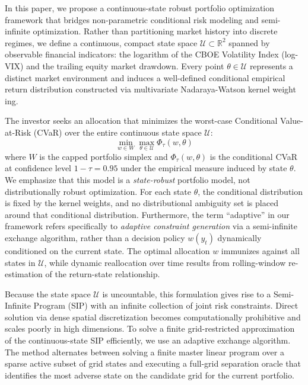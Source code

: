 \documentclass[smallextended]{svjour3}
\begin{document}
In this paper, we propose a continuous-state robust portfolio optimization framework that bridges non-parametric conditional risk modeling and semi-infinite optimization. Rather than partitioning market history into discrete regimes, we define a continuous, compact state space $\mathcal{U} \subset \mathbb{R}^2$ spanned by observable financial indicators: the logarithm of the CBOE Volatility Index (log-VIX) \cite{cboe2026vix} and the trailing equity market drawdown. Every point $\theta \in \mathcal{U}$ represents a distinct market environment and induces a well-defined conditional empirical return distribution constructed via multivariate Nadaraya-Watson kernel weight \cite{nadaraya1964estimating, watson1964smooth}ing.

The investor seeks an allocation that minimizes the worst-case Conditional Value-at-Risk (CVaR) over the entire continuous state space $\mathcal{U}$:
\begin{equation}
    \min_{w \in W} \max_{\theta \in \mathcal{U}} \Phi_\tau(w, \theta)
\end{equation}
where $W$ is the capped portfolio simplex and $\Phi_\tau(w, \theta)$ is the conditional CVaR at confidence level $1-\tau = 0.95$ under the empirical measure induced by state $\theta$. We emphasize that this model is a \emph{state-robust} portfolio model, not distributionally robust optimization. For each state $\theta$, the conditional distribution is fixed by the kernel weights, and no distributional ambiguity set is placed around that conditional distribution. Furthermore, the term ``adaptive'' in our framework refers specifically to \emph{adaptive constraint generation} via a semi-infinite exchange algorithm, rather than a decision policy $w(y_t)$ dynamically conditioned on the current state. The optimal allocation $w$ immunizes against all states in $\mathcal{U}$, while dynamic reallocation over time results from rolling-window re-estimation of the return-state relationship.

Because the state space $\mathcal{U}$ is uncountable, this formulation gives rise to a Semi-Infinite Program (SIP) with an infinite collection of joint risk constraints. Direct solution via dense spatial discretization becomes computationally prohibitive and scales poorly in high dimensions. To solve a finite grid-restricted approximation of the continuous-state SIP efficiently, we use an adaptive exchange algorithm. The method alternates between solving a finite master linear program over a sparse active subset of grid states and executing a full-grid separation oracle that identifies the most adverse state on the candidate grid for the current portfolio.
\end{document}
